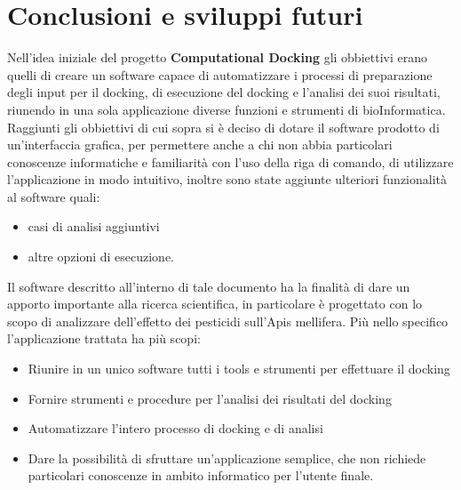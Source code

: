 \chapter{Conclusioni e sviluppi futuri}
Nell'idea iniziale del progetto \textbf{Computational Docking} gli obbiettivi erano quelli di creare un software capace di automatizzare i processi di preparazione degli input per il docking, di esecuzione del docking e l'analisi dei suoi risultati, riunendo in una sola applicazione diverse funzioni e strumenti di bioInformatica. Raggiunti gli obbiettivi di cui sopra si è deciso di dotare il software prodotto di un'interfaccia grafica, per permettere anche a chi non abbia particolari conoscenze informatiche e familiarità con l'uso della riga di comando, di utilizzare l'applicazione in modo intuitivo, inoltre sono state aggiunte ulteriori funzionalità al software quali:

\begin{itemize}
    \item casi di analisi aggiuntivi
    \item altre opzioni di esecuzione. 
\end{itemize}

Il software descritto all'interno di tale documento ha la finalità di dare un apporto importante alla ricerca scientifica, in particolare è  progettato con lo scopo di analizzare dell'effetto dei pesticidi sull'Apis mellifera. Più nello specifico l'applicazione trattata ha più scopi: 

\begin{itemize}
    \item Riunire in un unico software tutti i tools e strumenti per effettuare il docking
    \item Fornire strumenti e procedure per l'analisi dei risultati del docking
    \item Automatizzare l'intero processo di docking e di analisi
    \item Dare la possibilità di sfruttare un'applicazione semplice, che non richiede particolari conoscenze in ambito informatico per l'utente finale.
\end{itemize}

